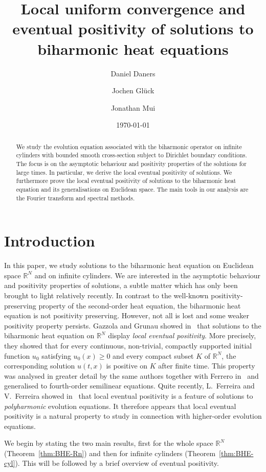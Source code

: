 \documentclass[a4paper, reqno,titlepage]{amsart}
\title[Biharmonic heat equations]{Local uniform convergence and eventual positivity of solutions to biharmonic heat equations}
\author[D. Daners]{Daniel Daners}
\author[J. Gl\"{u}ck]{Jochen Gl\"{u}ck}
\author[J. Mui]{Jonathan Mui}
\date{\today}
\numberwithin{equation}{section}
\theoremstyle{plain}
\theoremstyle{definition}
\theoremstyle{remark}
\newcommand{\RR}{\mathbb{R}}
\begin{document}
\begin{abstract}
  We study the evolution equation associated with the biharmonic operator on infinite cylinders with bounded smooth cross-section subject to Dirichlet boundary conditions. The focus is on the asymptotic behaviour and positivity properties of the solutions for large times. In particular, we derive the local eventual positivity of solutions. We furthermore prove the local eventual positivity of solutions to the biharmonic heat equation and its generalisations on Euclidean space. The main tools in our analysis are the Fourier transform and spectral methods.
\end{abstract}

\maketitle

\section{Introduction}

In this paper, we study solutions to the biharmonic heat equation on Euclidean space $\RR^N$ and on infinite cylinders. We are interested in the asymptotic behaviour and positivity properties of solutions, a subtle matter which has only been brought to light relatively recently. In contrast to the well-known positivity-preserving property of the second-order heat equation, the biharmonic heat equation is not positivity preserving. However, not all is lost and some weaker positivity property persists. Gazzola and Grunau showed in~\cite{GG-lep} that solutions to the biharmonic heat equation on $\RR^N$ display \emph{local eventual positivity}. More precisely, they showed that for every continuous, non-trivial, compactly supported initial function $u_0$ satisfying $u_0(x) \geq 0$ and every compact subset $K$ of $\RR^N$, the corresponding solution $u(t,x)$ is positive on $K$ after finite time. This property was analysed in greater detail by the same authors together with Ferrero in~\cite{FGG} and generalised to fourth-order semilinear equations. Quite recently, L.~Ferreira and V.~Ferreira showed in~\cite{FF-lep} that local eventual positivity is a feature of solutions to \emph{polyharmonic} evolution equations. It therefore appears that local eventual positivity is a natural property to study in connection with higher-order evolution equations.

We begin by stating the two main results, first for the whole space $\RR^N$ (Theorem~\ref{thm:BHE-Rn}) and then for infinite cylinders (Theorem~\ref{thm:BHE-cyl}). This will be followed by a brief overview of eventual positivity.
\end{document}
